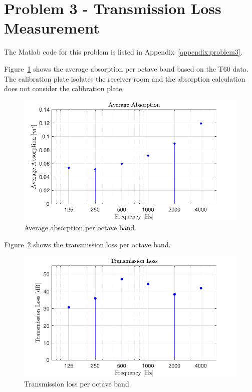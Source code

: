 {\newpage
\section*{Problem 3 - Transmission Loss Measurement}

The Matlab code for this problem is listed in Appendix~\ref{appendix:problem3}.

\vspace{0.25cm}
Figure~\ref{figure:q3AverageAbsorption} shows the average absorption per octave band based on the T60 data.  The calibration plate isolates the receiver room and the absorption calculation does not consider the calibration plate.


\begin{figure}[htb!]
    \center
        \includegraphics[scale = 1.0, keepaspectratio]{Q3 Average Absorption.pdf}
    \vspace{0.25cm}        
    \caption{Average absorption per octave band.}
    \label{figure:q3AverageAbsorption}
\end{figure}


\vspace{0.2cm}
Figure~\ref{figure:q3TransmissionLoss} shows the transmission loss per octave band.


\begin{figure}[htb!]
    \center
        \includegraphics[scale = 1.0, keepaspectratio]{Q3 Transmission Loss.pdf}
    \vspace{0.25cm}
    \caption{Transmission loss per octave band.}
    \label{figure:q3TransmissionLoss}
\end{figure}






}
